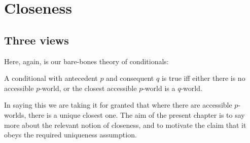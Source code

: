 \documentclass[If.tex]{subfiles}
\begin{document}
\chapter{Closeness}
\label{chap:cem}
\begin{comment}

	\begin{itemize}
		\item
		Other arguments for CEM: Neg-raising and small differences.
		(What were we thinking here?  Maybe the idea is that the CEM-lover can explain why we are as careless as we are about the placement of ‘not’, whereas for strictists it should be analogous to the case of ‘have to’ where there is no temptation to conflate ‘don't have to’ with ‘have to not’.  Not sure if there's really a whole separate argument here.)
		\item
		The super-contextualist response [response to what exactly?]. It has to posit lots of mid-sentence context-shifts in cases where it seems really implausible.
		\item
		Just a footnote on the terrible Reverse Sobel Sequence argument for strictism - appeal to Moss.
		\item
		The deepest considerations in favour of strictism come from the desire to have a uniform treatment of propositional conditionals and conditionals with adverbs of quantification. We'll get to this in a later chapter.
		\item
		Does Kratzer have any arguments that the hidden operator in indicatives is ‘must’-like? One could make an argument from the premise that we never see a \emph{lexicalised} modal that is epistemic but has the kind of ordering source feel that would be required by a CEM lover.
	\end{itemize}

\end{comment}

\section{Three views}\label{why-closest}
Here, again, is our bare-bones theory of conditionals:
\begin{prop}
\litem[CLOSEST] \label{closest}
	A conditional with antecedent $p$ and consequent $q$ is true iff either there is no accessible $p$-world, or the closest accessible $p$-world is a $q$-world.
\end{prop}
In saying this we are taking it for granted that where there are accessible $p$-worlds, there is a unique closest one. The aim of the present chapter is to say more about the relevant notion of closeness, and to motivate the claim that it obeys the required uniqueness assumption.
\end{document}
